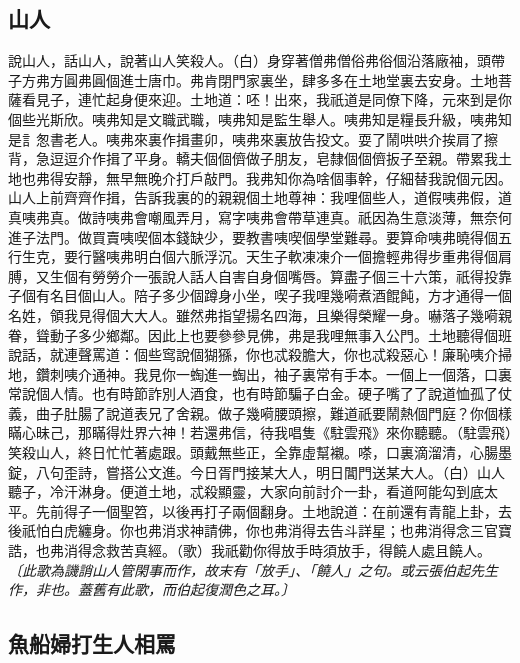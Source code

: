\subsection*{山人}

說山人，話山人，說著山人笑殺人。（白）身穿著僧弗僧俗弗俗個沿落廠袖，頭帶子方弗方圓弗圓個進士唐巾。弗肯閉門家裏坐，肆多多在土地堂裏去安身。土地菩薩看見子，連忙起身便來迎。土地道：呸！出來，我祇道是同僚下降，元來到是你個些光斯欣。咦弗知是文職武職，咦弗知是監生舉人。咦弗知是糧長升級，咦弗知是訁怱書老人。咦弗來裏作揖畫卯，咦弗來裏放告投文。耍了鬧哄哄介挨肩了擦背，急逗逗介作揖了平身。轎夫個個儕做子朋友，皂隸個個儕扳子至親。帶累我土地也弗得安靜，無早無晚介打戶敲門。我弗知你為啥個事幹，仔細替我說個元因。山人上前齊齊作揖，告訴我裏的的親親個土地尊神：我哩個些人，道假咦弗假，道真咦弗真。做詩咦弗會嘲風弄月，寫字咦弗會帶草連真。祇因為生意淡薄，無奈何進子法門。做買賣咦喫個本錢缺少，要教書咦喫個學堂難尋。要算命咦弗曉得個五行生克，要行醫咦弗明白個六脈浮沉。天生子軟凍凍介一個擔輕弗得步重弗得個肩膊，又生個有勞勞介一張說人話人自害自身個嘴唇。算盡子個三十六策，祇得投靠子個有名目個山人。陪子多少個蹲身小坐，喫子我哩幾嗬煮酒餛飩，方才通得一個名姓，領我見得個大大人。雖然弗指望揚名四海，且樂得榮耀一身。嚇落子幾嗬親眷，聳動子多少鄉鄰。因此上也要參參見佛，弗是我哩無事入公門。土地聽得個班說話，就連聲罵道：個些窎說個猢猻，你也忒殺膽大，你也忒殺惡心！廉恥咦介掃地，鑽刺咦介通神。我見你一蜪進一蜪出，袖子裏常有手本。一個上一個落，口裏常說個人情。也有時節詐別人酒食，也有時節騙子白金。硬子嘴了了說道恤孤了仗義，曲子肚腸了說道表兄了舍親。做子幾嗬腰頭擦，難道祇要鬧熱個門庭？你個樣瞞心昧己，那瞞得灶界六神！若還弗信，待我唱隻《駐雲飛》來你聽聽。（駐雲飛）笑殺山人，終日忙忙著處跟。頭戴無些正，全靠虛幫襯。嗏，口裏滴溜清，心腸墨錠，八句歪詩，嘗搭公文進。今日胥門接某大人，明日閶門送某大人。（白）山人聽子，冷汗淋身。便道土地，忒殺顯靈，大家向前討介一卦，看道阿能勾到底太平。先前得子一個聖笤，以後再打子兩個翻身。土地說道：在前還有青龍上卦，去後祇怕白虎纏身。你也弗消求神請佛，你也弗消得去告斗詳星；也弗消得念三官寶誥，也弗消得念救苦真經。（歌）我祇勸你得放手時須放手，得饒人處且饒人。
\textit{〔此歌為譏誚山人管閑事而作，故末有「放手」、「饒人」之句。或云張伯起先生作，非也。蓋舊有此歌，而伯起復潤色之耳。〕}

\subsection*{魚船婦打生人相罵}


